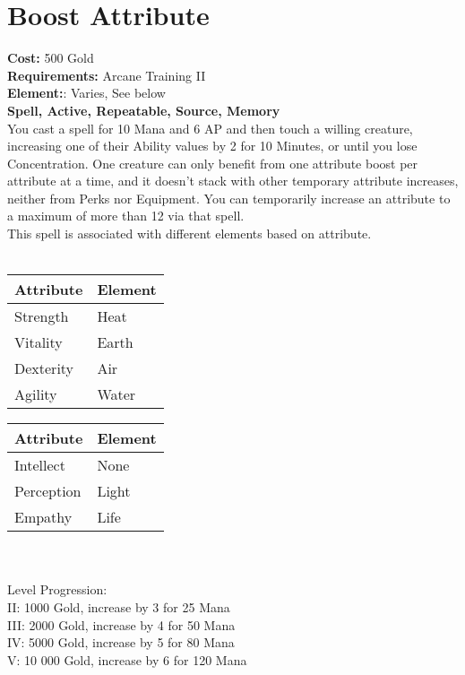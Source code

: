\section*{Boost Attribute}
\textbf{Cost:} 500 Gold\\
\textbf{Requirements:} Arcane Training II\\
\textbf{Element:}: Varies, See below\\
\textbf{Spell, Active, Repeatable, Source, Memory}\\
You cast a spell for 10 Mana and 6 AP and then touch a willing creature, increasing one of their Ability values by 2 for 10 Minutes, or until you lose Concentration. One creature can only benefit from one attribute boost per attribute at a time, and it doesn’t stack with other temporary attribute increases, neither from Perks nor Equipment. You can temporarily increase an attribute to a maximum of more than 12 via that spell.\\
This spell is associated with different elements based on attribute.\\
\\
\begin{minipage}{0.5\textwidth}
	\begin{tabular}{l | l} 
		Attribute & Element\\ \hline
		Strength & Heat\\
		Vitality & Earth\\
		Dexterity & Air\\
		Agility & Water\\
	\end{tabular}
\end{minipage}
\begin{minipage}{0.5\textwidth}
	\begin{tabular}{l | l}
		Attribute & Element\\ \hline
		Intellect & None\\
		Perception & Light\\
		Empathy & Life\\
	\end{tabular}
\end{minipage}
\\
\\
Level Progression:\\
II: 1000 Gold, increase by 3 for 25 Mana\\
III: 2000 Gold, increase by 4 for 50 Mana\\
IV: 5000 Gold, increase by 5 for 80 Mana\\
V: 10 000 Gold, increase by 6 for 120 Mana\\